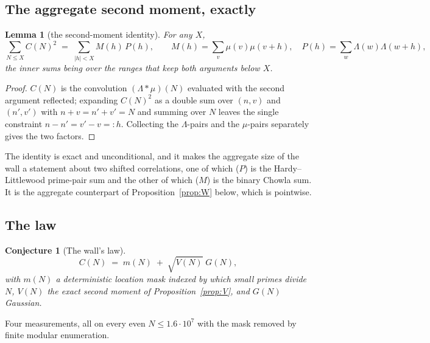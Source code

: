 \documentclass[11pt,a4paper]{article}
\theoremstyle{plain}
\newtheorem{conjecture}[theorem]{Conjecture}
\newtheorem{lemma}[theorem]{Lemma}
\theoremstyle{definition}
\begin{document}
\subsection{The aggregate second moment, exactly}

\begin{lemma}[the second-moment identity]\label{lem:MP}
For any $X$,
\[
  \sum_{N\le X} C(N)^2 \;=\; \sum_{|h|<X} M(h)\,P(h),
  \qquad
  M(h) = \sum_{v} \mu(v)\mu(v+h),
  \quad
  P(h) = \sum_{w} \Lambda(w)\Lambda(w+h),
\]
the inner sums being over the ranges that keep both arguments below
$X$.
\end{lemma}

\begin{proof}
$C(N)$ is the convolution $(\Lambda * \mu)(N)$ evaluated with the
second argument reflected; expanding $C(N)^2$ as a double sum over
$(n,v)$ and $(n',v')$ with $n+v = n'+v' = N$ and summing over $N$
leaves the single constraint $n-n' = v'-v =: h$. Collecting the
$\Lambda$-pairs and the $\mu$-pairs separately gives the two factors.
\end{proof}

The identity is exact and unconditional, and it makes the aggregate
size of the wall a statement about two shifted correlations, one of
which ($P$) is the Hardy--Littlewood prime-pair sum and the other of
which ($M$) is the binary Chowla sum. It is the aggregate counterpart
of Proposition~\ref{prop:W} below, which is pointwise.

\subsection{The law}

\begin{conjecture}[The wall's law]\label{conj:wall}
\[
  C(N) \;=\; m(N) \;+\; \sqrt{V(N)}\;G(N),
\]
with $m(N)$ a deterministic \emph{location mask} indexed by which small
primes divide $N$, $V(N)$ the exact second moment of
Proposition~\ref{prop:V}, and $G(N)$ Gaussian.
\end{conjecture}

Four measurements, all on every even $N\le1.6\cdot10^7$ with the mask
removed by finite modular enumeration.
\end{document}
